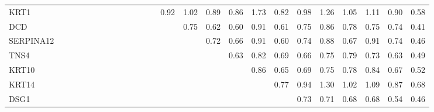 \begin{longtable}{lrrrrrrrrrrrrrrrrrrrrrrrr}
KRT1      &               &            &           &              &            &              &            &              &              &            &            &            &      0.92 &            1.02 &       0.89 &        0.86 &        1.73 &       0.82 &           0.98 &         1.26 &         1.05 &       1.11 &          0.90 &        0.58 \\
DCD       &               &            &           &              &            &              &            &              &              &            &            &            &           &            0.75 &       0.62 &        0.60 &        0.91 &       0.61 &           0.75 &         0.86 &         0.78 &       0.75 &          0.74 &        0.41 \\
SERPINA12 &               &            &           &              &            &              &            &              &              &            &            &            &           &                 &       0.72 &        0.66 &        0.91 &       0.60 &           0.74 &         0.88 &         0.67 &       0.91 &          0.74 &        0.46 \\
TNS4      &               &            &           &              &            &              &            &              &              &            &            &            &           &                 &            &        0.63 &        0.82 &       0.69 &           0.66 &         0.75 &         0.79 &       0.73 &          0.63 &        0.49 \\
KRT10     &               &            &           &              &            &              &            &              &              &            &            &            &           &                 &            &             &        0.86 &       0.65 &           0.69 &         0.75 &         0.78 &       0.84 &          0.67 &        0.52 \\
KRT14     &               &            &           &              &            &              &            &              &              &            &            &            &           &                 &            &             &             &       0.77 &           0.94 &         1.30 &         1.02 &       1.09 &          0.87 &        0.68 \\
DSG1      &               &            &           &              &            &              &            &              &              &            &            &            &           &                 &            &             &             &            &           0.73 &         0.71 &         0.68 &       0.68 &          0.54 &        0.46 \\

\end{longtable}
